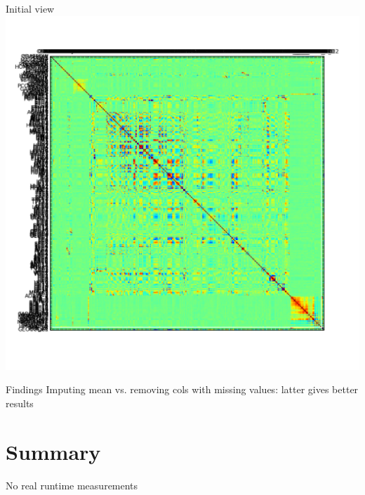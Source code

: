 \documentclass[12pt]{beamer}
\begin{document}
\begin{frame}{Initial view}
\includegraphics[height=\textheight,width=\textwidth,keepaspectratio]{plots/kdd_final.png}
\end{frame}

\begin{frame}{Findings}
Imputing mean vs. removing cols with missing values: latter gives better results
\end{frame}

\section{Summary}
\begin{frame}

No real runtime measurements
\end{frame}
\end{document}
